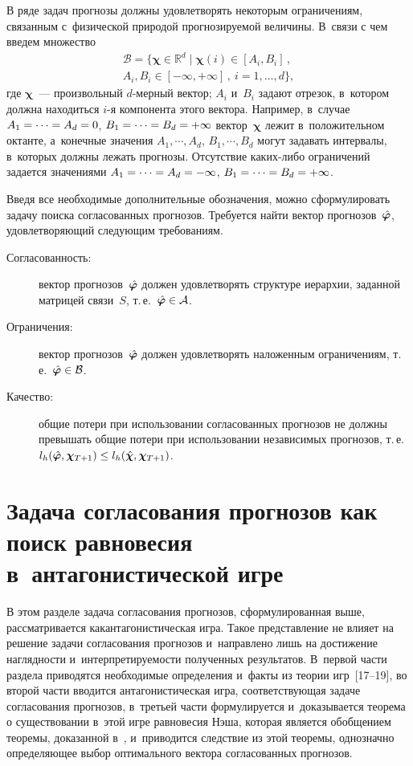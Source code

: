 \begin{multicols}{2}
В ряде задач прогнозы должны удовлетворять некоторым ограничениям,
связанным с~физической природой прогнозируемой величины. В~связи
с чем введем множество
\begin{multline}
\label{eq:SetPhysicsConstraint}
    \mathcal{B} = \{ \boldsymbol{\chi} \in \mathbb{R}^d \mid \boldsymbol{\chi}(i)
    \in [A_i, B_i]\,,\\
     A_i, B_i \in [-\infty, +\infty]\,,\ i = 1, \ldots, d
    \},
\end{multline}
где $\boldsymbol{\chi}$~--- произвольный $d$-мер\-ный вектор; $A_i$
и~$B_i$ задают отрезок, в~котором должна находиться \mbox{$i$-я}
компонента этого вектора. Например, в~случае $A_1 \hm= \cdots = A_d \hm=
0$, $B_1 \hm= \cdots = B_d \hm= +\infty$ вектор~$\boldsymbol{\chi}$
лежит в~положительном октанте, а~конечные значения $A_1, \cdots,
A_d$, $B_1, \cdots, B_d$ могут задавать интервалы, в~которых
должны лежать прогнозы. Отсутствие ка\-ких-ли\-бо ограничений задается
значениями $A_1 \hm= \cdots = A_d \hm= -\infty$, $B_1 \hm= \cdots = B_d \hm=
+\infty$.

Введя все необходимые дополнительные обозначения, можно
сформулировать задачу поиска согласованных прогнозов. Требуется
найти вектор прогнозов~$\hat{\boldsymbol{\varphi}}$, удовлетворяющий следующим
требованиям.
\begin{description}
    \item[Согласованность:] вектор прогнозов~$\hat{\boldsymbol{\varphi}}$ должен
    удов\-ле\-тво\-рять структуре иерархии, заданной мат\-ри\-цей связи~$S$,
    т.\,е.\ $\hphi \hm\in \mathcal{A}$.
    \item[Ограничения:] вектор прогнозов~$\hat{\boldsymbol{\varphi}}$ должен
    удовлетворять наложенным ограничениям, т.\,е.\ $\hphi \hm\in \mathcal{B}$.
    \item[Качество:] общие потери при использовании согласованных
    прогнозов не должны превышать общие потери при использовании
    независимых прогнозов, т.\,е.\ ${l_h(\hphi, \boldsymbol{\chi}_{T + 1}) \hm\leq l_h(\hchi, \boldsymbol{\chi}_{T +    1})}$.
\end{description}


\section{Задача согласования прогнозов как поиск равновесия
в~антагонистической игре}

В этом разделе задача согласования прогнозов, сформулированная
выше, рассматривается как\linebreak антагонистическая игра. Такое
представление не влияет на решение задачи согласования прогнозов
и~направлено лишь на достижение на\-гляд\-ности и~интерпретируемости
полученных ре\-зультатов. В~первой части раздела приводятся
необходимые определения и~факты из теории игр~[17--19],
 во второй части вводится
антагонистическая игра, соответствующая задаче согласования
прогнозов, в~треть\-ей части формулируется и~доказывается теорема о
существовании в~этой игре равновесия Нэша, которая является
обобщением теоремы, доказанной в~\cite{vanerven:hal-00920559},
и~приводится следствие из этой теоремы, однозначно определяющее
выбор оптимального вектора согласованных прогнозов.


\end{multicols}

